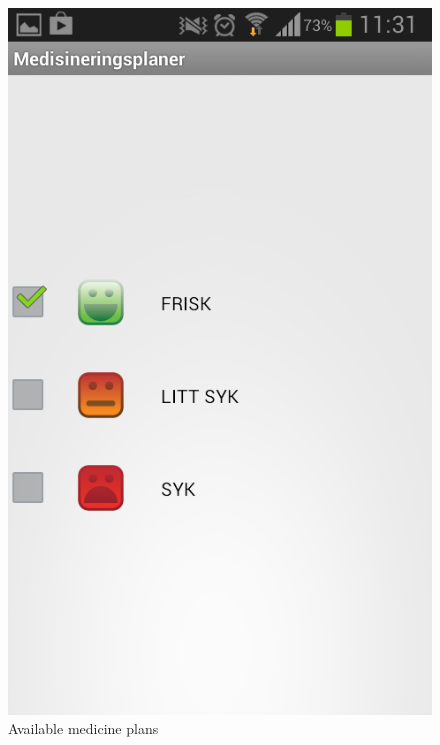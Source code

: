 \begin{figure}
\begin{minipage}[t]{0.4\linewidth}
			\includegraphics[width=0.20\paperwidth]{Pictures/new-screenshots/medicine-plans.png}
		\caption{Available medicine plans}
		\label{fig:parent_medicine_plans}
	\end{minipage}
	\begin{minipage}[t]{0.4\linewidth}
		\centering

\end{minipage}
\end{figure}
